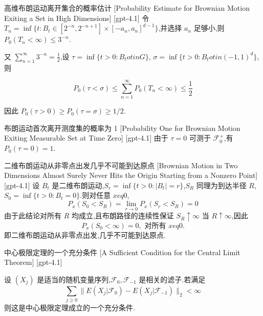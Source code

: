 \documentclass[UTF8]{ctexart}
\begin{document}
    \begin{thm}
        {高维布朗运动离开集合的概率估计}
        [Probability Estimate for Brownian Motion Exiting a Set in High Dimensions]
        [gpt-4.1]
        令 $T_n = \inf \{ t : B_t \in [2^{-n}, 2^{-n+1}] \times [-a_n, a_n]^{d-1} \}$,并选择 $a_n$ 足够小,则 $P_0(T_n < \infty) \leq 3^{-n}$.

又 $\sum_{n=1}^{\infty} 3^{-n} = \frac{1}{2}$,设 $\tau = \inf \{ t > 0 : B_t 
otin G \}$, $\sigma = \inf \{ t > 0 : B_t 
otin (-1,1)^d \}$,则

\[
P_0(\tau < \sigma) \leq \sum_{n=1}^{\infty} P_0(T_n < \infty) \leq \frac{1}{2}
\]

因此 $P_0(\tau > 0) \ge P_0(\tau = \sigma) \ge 1/2$.

    \end{thm}
    
    
    
    \begin{thm}
        {布朗运动首次离开测度集的概率为 1}
        [Probability One for Brownian Motion Exiting Measurable Set at Time Zero]
        [gpt-4.1]
        由于 $\tau = 0$ 可测于 $\mathcal{F}_0^+$,有 $P_0(\tau = 0) = 1$.

    \end{thm}
    
    
    
    \begin{thm}
        {二维布朗运动从非零点出发几乎不可能到达原点}
        [Brownian Motion in Two Dimensions Almost Surely Never Hits the Origin Starting from a Nonzero Point]
        [gpt-4.1]
        设 $B_t$ 是二维布朗运动,$S_r = \inf\{ t > 0 : |B_t| = r \}$,$S_R$ 同理为到达半径 $R$,$S_0 = \inf\{ t > 0 : B_t = 0 \}$.则对任意 $x 
eq 0$,
\[
P_x(S_0 < S_R) = \lim_{r \to 0} P_x(S_r < S_R) = 0
\]
由于此结论对所有 $R$ 均成立,且布朗路径的连续性保证 $S_R \uparrow \infty$ 当 $R \uparrow \infty$,因此
\[
P_x(S_0 < \infty) = 0, \text{ 对所有 } x 
eq 0.
\]
即二维布朗运动从非零点出发,几乎不可能到达原点.

    \end{thm}
    
    
    
    \begin{thm}
        {中心极限定理的一个充分条件}
        [A Sufficient Condition for the Central Limit Theorem]
        [gpt-4.1]
        
设 $(X_j)$ 是适当的随机变量序列,$\mathcal{F}_0, \mathcal{F}_{-1}$ 是相关的滤子.若满足
\[
\sum_{j \geq 0} \| E ( X_{j} | \mathcal{F}_{0} ) - E ( X_{j} | \mathcal{F}_{-1} ) \|_{2} < \infty
\]
则这是中心极限定理成立的一个充分条件.

    \end{thm}
    
\end{document}
